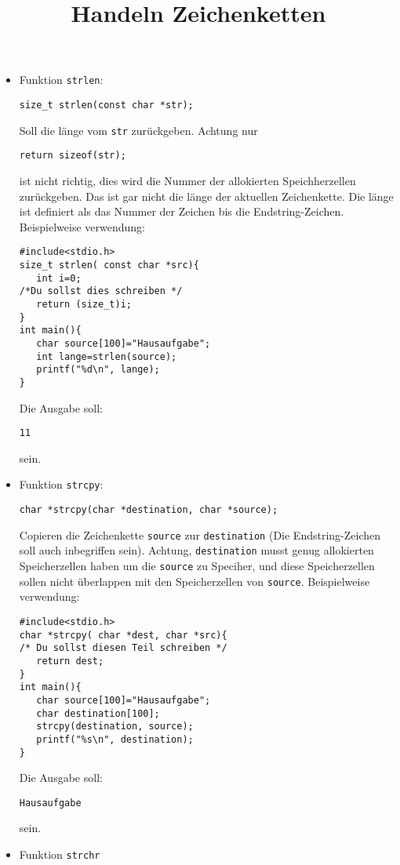 \documentclass{article}[12pt]
\title{Handeln Zeichenketten}
\begin{document}
\maketitle
\begin{itemize}
\item Funktion \texttt{strlen}:
\begin{lstlisting}
size_t strlen(const char *str);
\end{lstlisting}
Soll die länge vom \texttt{str} zurückgeben.
Achtung nur 
\begin{lstlisting}
return sizeof(str);
\end{lstlisting}
ist nicht richtig, dies wird die Nummer der allokierten Speichherzellen zurückgeben. Das ist gar nicht die länge
der aktuellen Zeichenkette. Die länge ist definiert als das Nummer der Zeichen bis die Endstring-Zeichen.
Beispielweise verwendung:
\begin{lstlisting}
#include<stdio.h>
size_t strlen( const char *src){
   int i=0;
/*Du sollst dies schreiben */
   return (size_t)i;
}
int main(){
   char source[100]="Hausaufgabe";
   int lange=strlen(source);
   printf("%d\n", lange);
}
\end{lstlisting}
Die Ausgabe soll:
\begin{lstlisting}
11
\end{lstlisting}
sein.
\item Funktion \texttt{strcpy}:
\begin{lstlisting}
char *strcpy(char *destination, char *source);
\end{lstlisting}
Copieren die Zeichenkette \texttt{source} zur \texttt{destination} (Die Endstring-Zeichen soll auch inbegriffen sein). 
Achtung, \texttt{destination} musst genug allokierten Speicherzellen haben um die \texttt{source} zu Speciher, und 
diese Speicherzellen sollen nicht überlappen mit den Speicherzellen von \texttt{source}.
Beispielweise verwendung:
\begin{lstlisting}
#include<stdio.h>
char *strcpy( char *dest, char *src){
/* Du sollst diesen Teil schreiben */   
   return dest;
}
int main(){
   char source[100]="Hausaufgabe";
   char destination[100];
   strcpy(destination, source);
   printf("%s\n", destination);
}
\end{lstlisting}
Die Ausgabe soll:
\begin{lstlisting}
Hausaufgabe
\end{lstlisting}
sein.
\item Funktion \texttt{strchr}
\begin{lstlisting}

\end{lstlisting}
\end{itemize}
\end{document}
